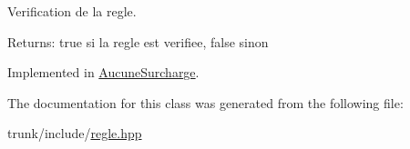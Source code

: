 Verification de la regle. 

\begin{Desc}
\item[Returns:]true si la regle est verifiee, false sinon \end{Desc}


Implemented in \hyperlink{classAucuneSurcharge_d96084db10b49f9c48f6cb005248f7c4}{AucuneSurcharge}.

The documentation for this class was generated from the following file:\begin{CompactItemize}
\item 
trunk/include/\hyperlink{regle_8hpp}{regle.hpp}\end{CompactItemize}
